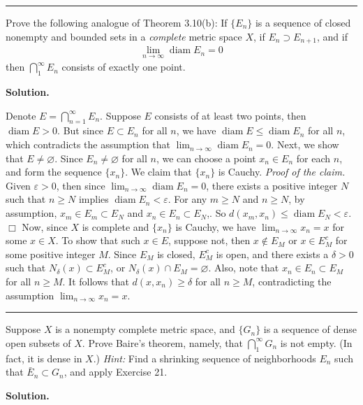 \documentclass[12pt]{article}
\theoremstyle{definition}
\begin{document}
\bigskip\noindent\hrule\bigskip

Prove the following analogue of Theorem 3.10(b): If $\{E_n\}$ is a sequence of closed nonempty and bounded sets in a \textit{complete} metric space $X$, if $E_n\supset E_{n+1}$, and if
\begin{align*}
\lim_{n\to\infty}\operatorname{diam}E_n=0
\end{align*}
then $\bigcap_{1}^\infty E_n$ consists of exactly one point.

\smallskip
\noindent\textbf{Solution.}\quad

Denote $E=\bigcap_{n=1}^\infty E_n$. Suppose $E$ consists of at least two points, then $\operatorname{diam}E>0$. But since $E\subset E_n$ for all $n$, we have $\operatorname{diam}E\le\operatorname{diam}E_n$ for all $n$, which contradicts the assumption that $\lim_{n\to\infty}\operatorname{diam}E_n=0$. Next, we show that $E\ne\varnothing$. Since $E_n\ne\varnothing$ for all $n$, we can choose a point $x_n\in E_n$ for each $n$, and form the sequence $\{x_n\}$. We claim that $\{x_n\}$ is Cauchy.
\textit{Proof of the claim.} Given $\varepsilon>0$, then since $\lim_{n\to\infty}\operatorname{diam}E_n=0$, there exists a positive integer $N$ such that $n\ge N$ implies $\operatorname{diam}E_n<\varepsilon$. For any $m\ge N$ and $n\ge N$, by assumption, $x_m\in E_m\subset E_N$ and $x_n\in E_n\subset E_N$,. So $d(x_m,x_n)\le\operatorname{diam}E_N<\varepsilon$. $\Box$
Now, since $X$ is complete and $\{x_n\}$ is Cauchy, we have $\lim_{n\to\infty}x_n=x$ for some $x\in X$. To show that such $x\in E$, suppose not, then $x\notin E_M$ or $x\in E_M^c$ for some positive integer $M$. Since $E_M$ is closed, $E_M^c$ is open, and there exists a $\delta>0$ such that $N_\delta(x)\subset E_M^c$, or $N_\delta(x)\cap E_M=\varnothing$. Also, note that $x_n\in E_n\subset E_M$ for all $n\ge M$. It follows that $d(x,x_n)\ge\delta$ for all $n\ge M$, contradicting the assumption $\lim_{n\to\infty}x_n=x$.



\bigskip\noindent\hrule\bigskip

Suppose $X$ is a nonempty complete metric space, and $\{G_n\}$ is a sequence of dense open subsets of $X$. Prove Baire's theorem, namely, that $\bigcap_{1}^\infty G_n$ is not empty. (In fact, it is dense in $X$.) \textit{Hint:} Find a shrinking sequence of neighborhoods $E_n$ such that $\bar{E}_n\subset G_n$, and apply Exercise 21.

\smallskip
\noindent\textbf{Solution.}\quad
\end{document}
